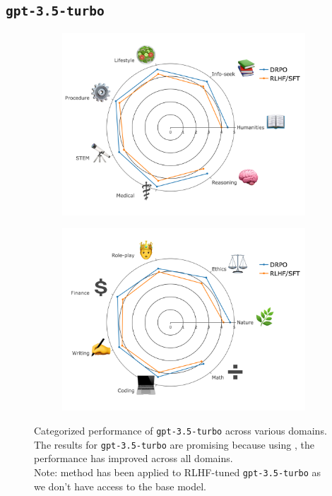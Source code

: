\newpage
\subsection{\texttt{gpt-3.5-turbo}}

\begin{figure}[h]
\centering
\begin{subfigure}[b]{.5\textwidth}
  \centering
  \includegraphics[width=0.95\linewidth]{images/gpt_1.png}
  \label{fig:cat_gpt_1}
\end{subfigure}%

\vspace{1em}

\begin{subfigure}[b]{.5\textwidth}
  \centering
  \includegraphics[width=0.95\linewidth]{images/gpt_2.png}
  \label{fig:cat_gpt_2}
\end{subfigure}
\caption{Categorized performance of \texttt{gpt-3.5-turbo} across various domains. The results for \texttt{gpt-3.5-turbo} are promising because using \ours, the performance has improved across all domains. \\
Note: \ours method has been applied to RLHF-tuned \texttt{gpt-3.5-turbo} as we don't have access to the base model.
}
\label{fig:categorized_performance_gpt}
\end{figure}


